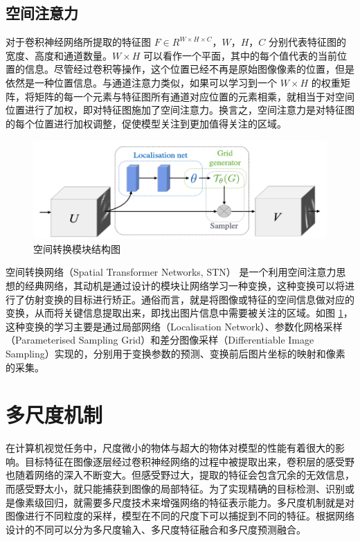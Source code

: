 \subsection{空间注意力}

对于卷积神经网络所提取的特征图 $F\in R^{W\times H\times C}$，$W$，$H$，$C$ 分别代表特征图的宽度、高度和通道数量。$W\times H$ 可以看作一个平面，其中的每个值代表的当前位置的信息。尽管经过卷积等操作，这个位置已经不再是原始图像像素的位置，但是依然是一种位置信息。与通道注意力类似，如果可以学习到一个 $W\times H$ 的权重矩阵，将矩阵的每一个元素与特征图所有通道对应位置的元素相乘，就相当于对空间位置进行了加权，即对特征图施加了空间注意力。换言之，空间注意力是对特征图的每个位置进行加权调整，促使模型关注到更加值得关注的区域。

\begin{figure}[!htbp]
	\centering
	\includegraphics{figures/13.png}
	\caption{空间转换模块结构图}
	\label{fig:fig2-12}
	\vspace{-0.8cm}  %
\end{figure}

空间转换网络（Spatial Transformer Networks, STN）\cite{DBLP:conf/nips/JaderbergSZK15} 是一个利用空间注意力思想的经典网络，其动机是通过设计的模块让网络学习一种变换，这种变换可以将进行了仿射变换的目标进行矫正。通俗而言，就是将图像或特征的空间信息做对应的变换，从而将关键信息提取出来，即找出图片信息中需要被关注的区域。如图 \ref{fig:fig2-12}，这种变换的学习主要是通过局部网络（Localisation Network）、参数化网格采样（Parameterised Sampling Grid）和差分图像采样（Differentiable Image Sampling）实现的，分别用于变换参数的预测、变换前后图片坐标的映射和像素的采集。

\section{多尺度机制}

在计算机视觉任务中，尺度微小的物体与超大的物体对模型的性能有着很大的影响。目标特征在图像逐层经过卷积神经网络的过程中被提取出来，卷积层的感受野也随着网络的深入不断变大。但感受野过大，提取的特征会包含冗余的无效信息，而感受野太小，就只能捕获到图像的局部特征。为了实现精确的目标检测、识别或是像素级回归，就需要多尺度技术来增强网络的特征表示能力。多尺度机制就是对图像进行不同粒度的采样，模型在不同的尺度下可以捕捉到不同的特征。根据网络设计的不同可以分为多尺度输入、多尺度特征融合和多尺度预测融合。


